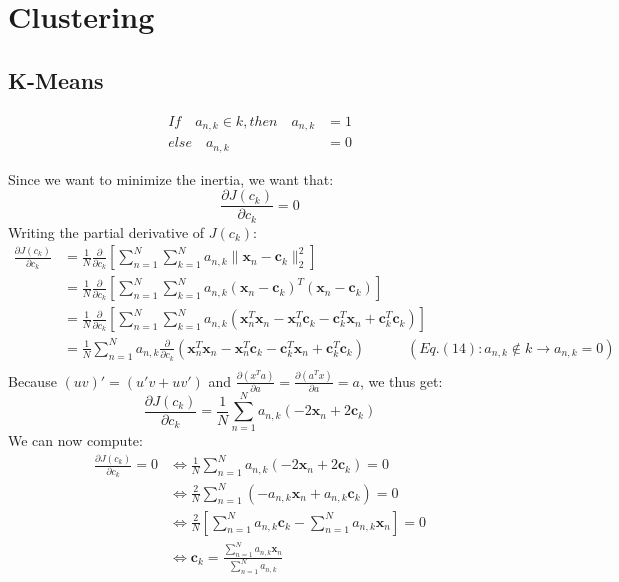 \documentclass{article}
\begin{document}
\section{Clustering}
\subsection{K-Means}
\begin{align}
If \quad a_{n,k} \in k, then \quad a_{n,k} & = 1 \\
else \quad a_{n,k} & = 0
\end{align}

Since we want to minimize the inertia, we want that:
\[
\frac{\partial J(c_k)}{\partial c_k} = 0
\]
Writing the partial derivative of $J(c_k)$:
\[
\begin{split}
\frac{\partial J(c_k)}{\partial c_k} & = \frac{1}{N}\frac{\partial }{\partial c_k}\left[\sum\limits_{n=1}^{N}\sum\limits_{k=1}^{N}a_{n,k}\parallel \mathbf{x}_n - \mathbf{c}_k \parallel_2 ^2\right]\\
& = \frac{1}{N}\frac{\partial }{\partial c_k}\left[\sum\limits_{n=1}^{N}\sum\limits_{k=1}^{N}a_{n,k}(\mathbf{x}_n - \mathbf{c}_k)^T(\mathbf{x}_n - \mathbf{c}_k)\right] \\
& = \frac{1}{N}\frac{\partial }{\partial c_k}\left[\sum\limits_{n=1}^{N}\sum\limits_{k=1}^{N}a_{n,k}(\mathbf{x}_n^T\mathbf{x}_n - \mathbf{x}_n^T\mathbf{c}_k - \mathbf{c}_k^T\mathbf{x}_n + \mathbf{c}_k^T\mathbf{c}_k)\right] \\
& = \frac{1}{N}\sum\limits_{n=1}^{N}a_{n,k}\frac{\partial }{\partial c_k}(\mathbf{x}_n^T\mathbf{x}_n - \mathbf{x}_n^T\mathbf{c}_k - \mathbf{c}_k^T\mathbf{x}_n + \mathbf{c}_k^T\mathbf{c}_k) \quad\quad\quad (Eq.(14): a_{n,k} \notin k \rightarrow a_{n,k} = 0) \\
\end{split}
\]
Because $(uv)'=(u'v + uv')$ and $\frac{\partial(x^Ta)}{\partial a} = \frac{\partial(a^Tx)}{\partial a} = a$, we thus get:
\[
\frac{\partial J(c_k)}{\partial c_k} = \frac{1}{N}\sum\limits_{n=1}^{N}a_{n,k}(-2\mathbf{x}_n +2\mathbf{c}_k)
\]
We can now compute:
\[
\begin{split}
\frac{\partial J(c_k)}{\partial c_k} = 0 & \Longleftrightarrow \frac{1}{N}\sum\limits_{n=1}^{N}a_{n,k}(-2\mathbf{x}_n +2\mathbf{c}_k) = 0\\
& \Longleftrightarrow \frac{2}{N}\sum\limits_{n=1}^{N}(-a_{n,k}\mathbf{x}_n +a_{n,k}\mathbf{c}_k) = 0 \\
& \Longleftrightarrow \frac{2}{N}\left[\sum\limits_{n=1}^{N}a_{n,k}\mathbf{c}_k-\sum\limits_{n=1}^{N}a_{n,k}\mathbf{x}_n\right]  = 0 \\
& \Longleftrightarrow \mathbf{c}_k = \frac{\sum\limits_{n=1}^{N}a_{n,k}\mathbf{x}_n}{\sum\limits_{n=1}^{N}a_{n,k}}
\end{split}
\]
\end{document}
